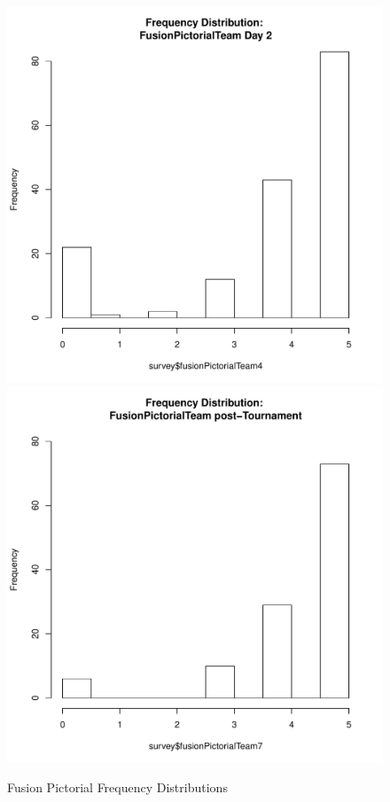 \documentclass[12pt]{report}
\begin{document}
{\begin{figure}[htbp]
  \includegraphics[scale =.4]{../images/distFusionPictorialTeamDay2.pdf}
  \includegraphics[scale =.4]{../images/distFusionPictorialTeamPost.pdf}
  \caption{Fusion Pictorial Frequency Distributions}
  \label{fig:fusionPictorialDist}
\end{figure}



}
\end{document}
